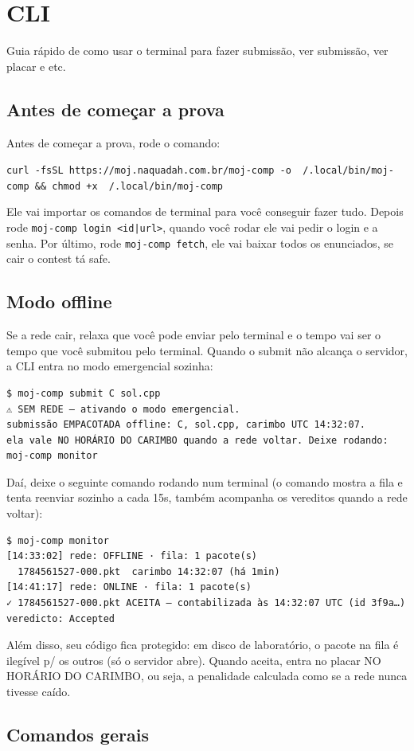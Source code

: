 \section{CLI}

Guia rápido de como usar o terminal para fazer submissão, ver submissão, ver placar e etc.

\subsection{Antes de começar a prova}

Antes de começar a prova, rode o comando:

\texttt{curl -fsSL https://moj.naquadah.com.br/moj-comp -o ~/.local/bin/moj-comp \&\& chmod +x ~/.local/bin/moj-comp} 

Ele vai importar os comandos de terminal para você conseguir fazer tudo. 
Depois rode \texttt{moj-comp login <id|url>}, quando você rodar ele vai pedir o login e a senha. Por último, rode \texttt{moj-comp fetch}, ele vai baixar todos os enunciados, se cair o contest tá safe.

\subsection{Modo offline}

Se a rede cair, relaxa que você pode enviar pelo terminal e o tempo vai ser o tempo que você submitou pelo terminal. Quando o submit não alcança o servidor, a CLI entra no modo emergencial sozinha:

\begin{verbatim}
$ moj-comp submit C sol.cpp
⚠ SEM REDE — ativando o modo emergencial.
submissão EMPACOTADA offline: C, sol.cpp, carimbo UTC 14:32:07.
ela vale NO HORÁRIO DO CARIMBO quando a rede voltar. Deixe rodando: moj-comp monitor
\end{verbatim}

Daí, deixe o seguinte comando rodando num terminal (o comando mostra a fila e tenta reenviar sozinho a cada 15s, também acompanha os vereditos quando a rede voltar):

\begin{verbatim}
$ moj-comp monitor
[14:33:02] rede: OFFLINE · fila: 1 pacote(s)
  1784561527-000.pkt  carimbo 14:32:07 (há 1min)
[14:41:17] rede: ONLINE · fila: 1 pacote(s)
✓ 1784561527-000.pkt ACEITA — contabilizada às 14:32:07 UTC (id 3f9a…)
veredicto: Accepted
\end{verbatim}

Além disso, seu código fica protegido: em disco de laboratório, o pacote na fila é ilegível p/ os outros (só o servidor abre). Quando aceita, entra no placar NO HORÁRIO DO CARIMBO, ou seja, a penalidade calculada como se a rede nunca tivesse caído.

\subsection{Comandos gerais}

